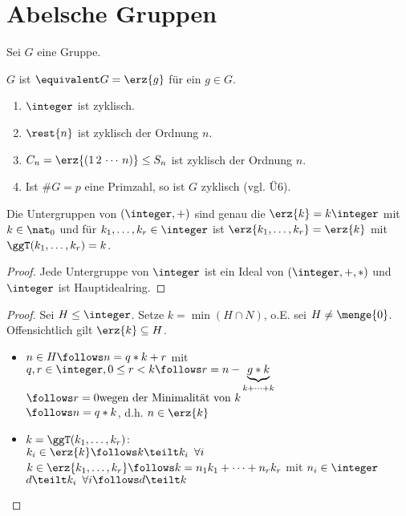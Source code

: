 \section{Abelsche Gruppen}
%
Sei $G$ eine Gruppe.
%
\begin{defin}
	$G$ ist  $\equivalent G = \erz{g}$ für ein $g \in G$.
\end{defin}
%
\begin{bsp}
	\begin{enumerate}
		\item $\integer$ ist zyklisch.
		\item $\rest{n}$ ist zyklisch der Ordnung $n$.
		\item $C_n = \erz{(1 \, 2 \, \cdots \, n)} \leq S_n$ ist zyklisch der Ordnung $n$.
		\item Ist $\#G = p$ eine Primzahl, so ist $G$ zyklisch (vgl. Ü6).
	\end{enumerate}
\end{bsp}
%
\begin{lemma} [!]
	Die Untergruppen von $(\integer, +)$ sind genau die $\erz{k} = k\integer$ mit $k \in \nat_0$ und für $k_1, \dots, k_r \in \integer$ ist $\erz{k_1, \dots , k_r} = \erz{k}$ mit $\ggT(k_1, \dots , k_r) = k$.
\end{lemma}
\begin{proof}
	Jede Untergruppe von $\integer$ ist ein Ideal von $(\integer,+,*)$ und $\integer$ ist Hauptidealring.
\end{proof}
\begin{proof}
	Sei $H \leq \integer$. Setze $k = \min (H \cap N)$, o.E. sei $H \neq \menge{0}$. Offensichtlich gilt $\erz{k} \subseteq H$.
	\begin{itemize}
		\item $n \in H \follows n = q*k + r$ mit $q,r \in \integer, 0 \leq r < k \follows r = n - \underbrace{g*k}_{k+\cdots+k}$ \\
		$\follows r = 0 \text{wegen der Minimalität von } k$ \\
		$\follows n = q*k$, d.h. $n \in \erz{k}$
		\item $k = \ggT(k_1, \dots , k_r)$: \\
		$k_i \in \erz{k} \follows k \teilt k_i \enspace \forall i$ \\
		$k \in \erz{k_1, \dots , k_r} \follows k = n_1 k_1 + \cdots + n_r k_r$ mit $n_i \in \integer$ \\
		$d \teilt k_i \enspace \forall i \follows d \teilt k$
	\end{itemize}
\end{proof}
